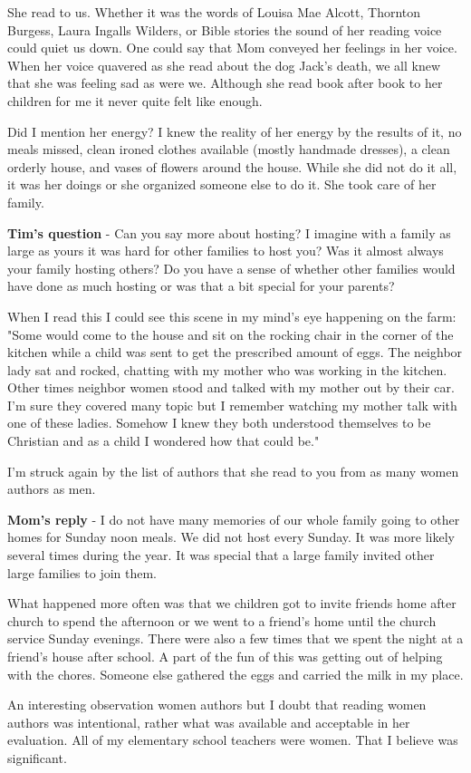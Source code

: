 She read to us.
Whether it was the words of Louisa Mae Alcott, Thornton Burgess, Laura Ingalls Wilders, or Bible stories the sound of her reading voice could quiet us down.
One could say that Mom conveyed her feelings in her voice.
When her voice quavered as she read about the dog Jack's death, we all knew that she was feeling sad as were we.
Although she read book after book to her children for me it never quite felt like enough.

Did I mention her energy? I knew the reality of her energy by the results of it, no meals missed, clean ironed clothes available (mostly handmade dresses), a clean orderly house, and vases of flowers around the house.
While she did not do it all, it was her doings or she organized someone else to do it.
She took care of her family.

\textbf{Tim's question} - Can you say more about hosting? I imagine with a family as large as yours it was hard for other families to host you? Was it almost always your family hosting others? Do you have a sense of whether other families would have done as much hosting or was that a bit special for your parents?

When I read this I could see this scene in my mind's eye happening on the farm:
"Some would come to the house and sit on the rocking chair in the corner of the kitchen while a child was sent to get the prescribed amount of eggs.
The neighbor lady sat and rocked, chatting with my mother who was working in the kitchen.
Other times neighbor women stood and talked with my mother out by their car.
I'm sure they covered many topic but I remember watching my mother talk with one of these ladies.
Somehow I knew they both understood themselves to be Christian and as a child I wondered how that could be."

I'm struck again by the list of authors that she read to you from as many women authors as men.

\textbf{Mom's reply} - I do not have many memories of our whole family going to other homes for Sunday noon meals.
We did not host every Sunday.
It was more likely several times during the year.
It was special that a large family invited other large families to join them.

What happened more often was that we children got to invite friends home after church to spend the afternoon or we went to a friend's home until the church service Sunday evenings.
There were also a few times that we spent the night at a friend's house after school.
A part of the fun of this was getting out of helping with the chores.
Someone else gathered the eggs and carried the milk in my place.

An interesting observation women authors but I doubt that reading women authors was intentional, rather what was available and acceptable in her evaluation.
All of my elementary school teachers were women.
That I believe was significant.




